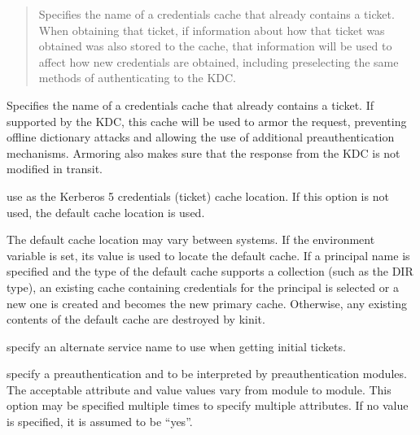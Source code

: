 \documentclass[letterpaper,10pt,english]{sphinxmanual}
\begin{document}
\sphinxAtStartPar
{} 
\begin{quote}

\sphinxAtStartPar
Specifies the name of a credentials cache that already contains a
ticket.  When obtaining that ticket, if information about how that
ticket was obtained was also stored to the cache, that information
will be used to affect how new credentials are obtained, including
preselecting the same methods of authenticating to the KDC.
\end{quote}
\begin{description}
\sphinxAtStartPar
Specifies the name of a credentials cache that already contains a
ticket.  If supported by the KDC, this cache will be used to armor
the request, preventing offline dictionary attacks and allowing
the use of additional preauthentication mechanisms.  Armoring also
makes sure that the response from the KDC is not modified in
transit.

\sphinxAtStartPar
use  as the Kerberos 5 credentials (ticket) cache
location.  If this option is not used, the default cache location
is used.

\sphinxAtStartPar
The default cache location may vary between systems.  If the
 environment variable is set, its value is used to
locate the default cache.  If a principal name is specified and
the type of the default cache supports a collection (such as the
DIR type), an existing cache containing credentials for the
principal is selected or a new one is created and becomes the new
primary cache.  Otherwise, any existing contents of the default
cache are destroyed by kinit.

\sphinxAtStartPar
specify an alternate service name to use when getting initial
tickets.

\sphinxAtStartPar
specify a pre\sphinxhyphen{}authentication  and  to be
interpreted by pre\sphinxhyphen{}authentication modules.  The acceptable
attribute and value values vary from module to module.  This
option may be specified multiple times to specify multiple
attributes.  If no value is specified, it is assumed to be “yes”.


\end{description}
\end{document}
